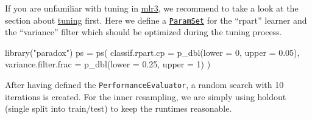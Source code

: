 \documentclass[
]{scrbook}
\newenvironment{Shaded}{\begin{snugshade}}{\end{snugshade}}
\newcommand{\AttributeTok}[1]{\textcolor[rgb]{0.77,0.63,0.00}{#1}}
\newcommand{\DecValTok}[1]{\textcolor[rgb]{0.00,0.00,0.81}{#1}}
\newcommand{\FloatTok}[1]{\textcolor[rgb]{0.00,0.00,0.81}{#1}}
\newcommand{\FunctionTok}[1]{\textcolor[rgb]{0.00,0.00,0.00}{#1}}
\newcommand{\NormalTok}[1]{#1}
\newcommand{\OtherTok}[1]{\textcolor[rgb]{0.56,0.35,0.01}{#1}}
\newcommand{\SpecialCharTok}[1]{\textcolor[rgb]{0.00,0.00,0.00}{#1}}
\newcommand{\StringTok}[1]{\textcolor[rgb]{0.31,0.60,0.02}{#1}}
\renewenvironment{Shaded} {\begin{snugshade}\small} {\end{snugshade}}
\begin{document}
If you are unfamiliar with tuning in \href{https://mlr3.mlr-org.com}{mlr3}, we recommend to take a look at the section about \protect\hyperlink{tuning}{tuning} first.
Here we define a \href{https://paradox.mlr-org.com/reference/ParamSet.html}{\texttt{ParamSet}} for the ``rpart'' learner and the ``variance'' filter which should be optimized during the tuning process.

\begin{Shaded}
\begin{Highlighting}[]
\FunctionTok{library}\NormalTok{(}\StringTok{"paradox"}\NormalTok{)}
\NormalTok{ps }\OtherTok{=} \FunctionTok{ps}\NormalTok{(}
  \AttributeTok{classif.rpart.cp =} \FunctionTok{p\_dbl}\NormalTok{(}\AttributeTok{lower =} \DecValTok{0}\NormalTok{, }\AttributeTok{upper =} \FloatTok{0.05}\NormalTok{),}
  \AttributeTok{variance.filter.frac =} \FunctionTok{p\_dbl}\NormalTok{(}\AttributeTok{lower =} \FloatTok{0.25}\NormalTok{, }\AttributeTok{upper =} \DecValTok{1}\NormalTok{)}
\NormalTok{)}
\end{Highlighting}
\end{Shaded}

After having defined the \texttt{PerformanceEvaluator}, a random search with 10 iterations is created.
For the inner resampling, we are simply using holdout (single split into train/test) to keep the runtimes reasonable.

\begin{Shaded}
\end{Shaded}

\begin{Shaded}
\end{Shaded}
\end{document}
